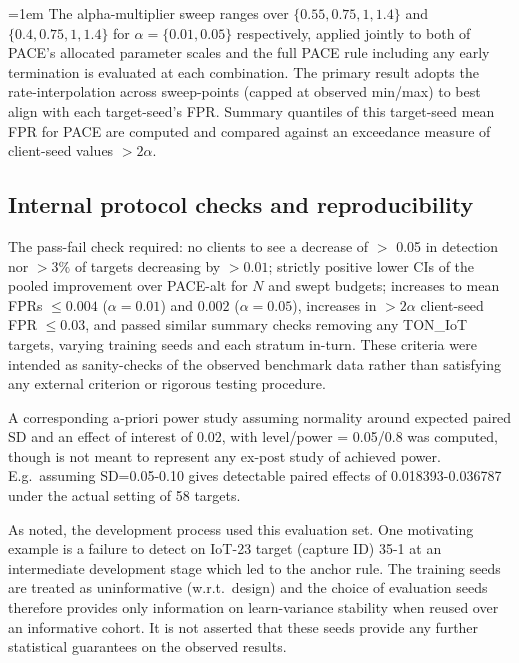\begingroup\emergencystretch=1em
The alpha-multiplier sweep ranges over $\{0.55, 0.75, 1, 1.4\}$ and $\{0.4, 0.75, 1, 1.4\}$ for $\alpha=\{0.01, 0.05\}$ respectively, applied jointly to both of PACE's allocated parameter scales and the full PACE rule including any early termination is evaluated at each combination. The primary result adopts the rate-interpolation across sweep-points (capped at observed min/max) to best align with each target-seed's FPR. Summary quantiles of this target-seed mean FPR for PACE are computed and compared against an exceedance measure of client-seed values $>2\alpha$.\par\endgroup

\subsection{Internal protocol checks and reproducibility} 
\label{sec:protocol-history} 
The pass-fail check required: no clients to see a decrease of $>$ 0.05 in detection nor $>3\%$ of targets decreasing by $>0.01$; strictly positive lower CIs of the pooled improvement over PACE-alt for $N$ and swept budgets; increases to mean FPRs $\leq 0.004$ ($\alpha=0.01$) and $0.002$ ($\alpha=0.05$), increases in $>2\alpha$ client-seed FPR $\leq 0.03$, and passed similar summary checks removing any TON\_IoT targets, varying training seeds and each stratum in-turn. These criteria were intended as sanity-checks of the observed benchmark data rather than satisfying any external criterion or rigorous testing procedure.

A corresponding a-priori power study assuming normality around expected paired SD and an effect of interest of 0.02, with level/power = 0.05/0.8 was computed, though is not meant to represent any ex-post study of achieved power. E.g.\ assuming SD=0.05-0.10 gives detectable paired effects of 0.018393-0.036787 under the actual setting of 58 targets.

As noted, the development process used this evaluation set. One motivating example is a failure to detect on IoT-23 target (capture ID) 35-1 at an intermediate development stage which led to the anchor rule. The training seeds are treated as uninformative (w.r.t.\ design) and the choice of evaluation seeds therefore provides only information on learn-variance stability when reused over an informative cohort. It is not asserted that these seeds provide any further statistical guarantees on the observed results.
